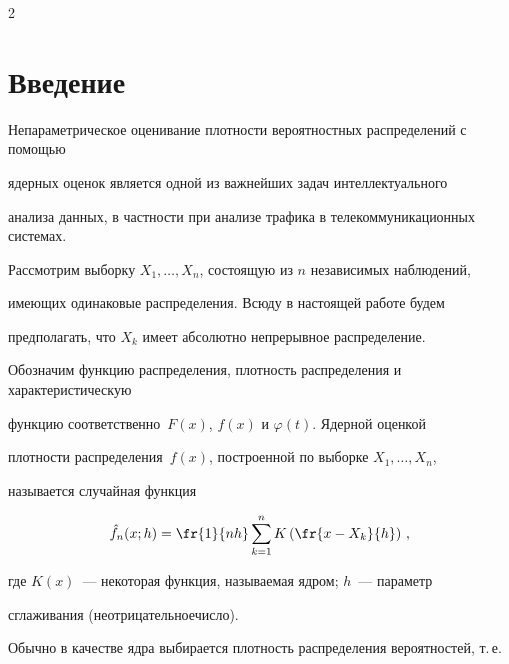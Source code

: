 


      \thispagestyle{headings}



      \begin{multicols}{2}

      

            \label{st\stat}



\section{Введение}



Непараметрическое оценивание плотности вероятностных распределений с помощью 

ядерных оценок является одной из важнейших задач интеллектуального

анализа данных, в частности при анализе трафика в телекоммуникационных системах.



Рассмотрим выборку $X_1,\ldots,X_n$, состоящую из $n$ независимых наблюдений,

имеющих одинаковые распределения. Всюду в настоящей работе будем

предполагать, что $X_k$ имеет абсолютно непрерывное распределение.

Обозначим функцию распределения, плотность распределения и характеристическую

функцию соответственно~$F(x)$, $f(x)$ и $\varphi(t)$. Ядерной оценкой

плотности распределения~$f(x)$, построенной по выборке $X_1,\ldots,X_n$,

называется случайная функция

\begin{equation*}

\hat f_n(x;h)=\fr{1}{nh}\sum\limits_{k=1}^nK\left(\fr{x-X_k}{h}\right)\,,


\end{equation*}

где $K(x)$~--- некоторая функция, называемая \mbox{ядром}; $h$~--- параметр

сглаживания (неотрицательное\linebreak чис\-ло).



Обычно в качестве ядра выбирается плотность распределения вероятностей, т.\,е.\


\end{multicols}
